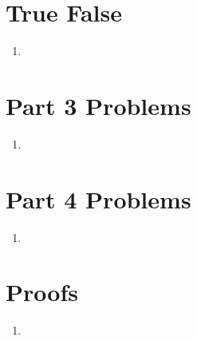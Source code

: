 \documentclass[11pt]{article}
\begin{document}
\section*{True False}
\begin{enumerate}
    \item 
\end{enumerate}
\pagebreak

\section{Part 3 Problems}
\begin{enumerate}
    \item 
\end{enumerate}
\pagebreak

\section{Part 4 Problems}
\begin{enumerate}
    \item 
\end{enumerate}
\pagebreak

\section{Proofs}
\begin{enumerate}
    \item 
\end{enumerate}
\end{document}
